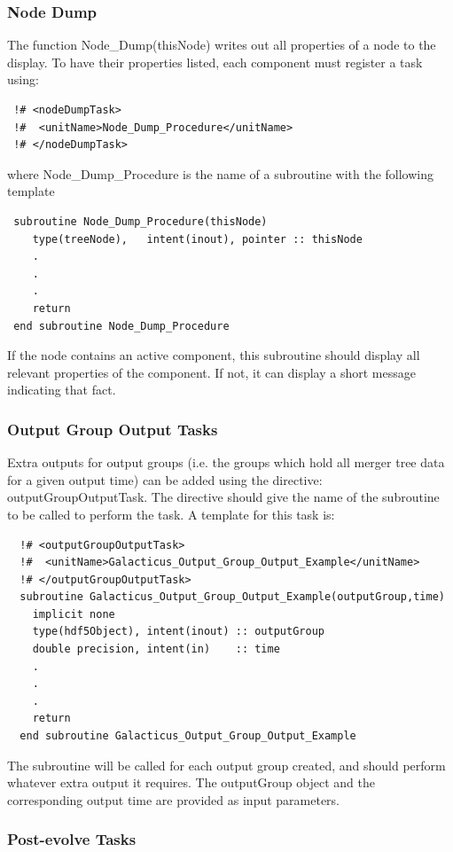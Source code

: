 \subsubsection{Node Dump}

The function {\normalfont \ttfamily Node\_Dump(thisNode)} writes out all properties of a node to the display. To have their properties listed, each component must register a task using:
\begin{verbatim}
 !# <nodeDumpTask>
 !#  <unitName>Node_Dump_Procedure</unitName>
 !# </nodeDumpTask>
\end{verbatim}
where {\normalfont \ttfamily Node\_Dump\_Procedure} is the name of a subroutine with the following template
\begin{verbatim}
 subroutine Node_Dump_Procedure(thisNode)
    type(treeNode),   intent(inout), pointer :: thisNode
    .
    .
    .
    return
 end subroutine Node_Dump_Procedure
\end{verbatim}
If the node contains an active component, this subroutine should display all relevant properties of the component. If not, it can display a short message indicating that fact.

\subsubsection{Output Group Output Tasks}

Extra outputs for output groups (i.e. the groups which hold all merger tree data for a given output time) can be added using the directive: {\normalfont \ttfamily outputGroupOutputTask}. The directive should give the name of the subroutine to be called to perform the task. A template for this task is:
\begin{verbatim}
  !# <outputGroupOutputTask>
  !#  <unitName>Galacticus_Output_Group_Output_Example</unitName>
  !# </outputGroupOutputTask>
  subroutine Galacticus_Output_Group_Output_Example(outputGroup,time)
    implicit none
    type(hdf5Object), intent(inout) :: outputGroup
    double precision, intent(in)    :: time
    .
    .
    .
    return
  end subroutine Galacticus_Output_Group_Output_Example
\end{verbatim}
The subroutine will be called for each output group created, and should perform whatever extra output it requires. The {\normalfont \ttfamily outputGroup} object and the corresponding output {\normalfont \ttfamily time} are provided as input parameters.


\subsubsection{Post-evolve Tasks}

